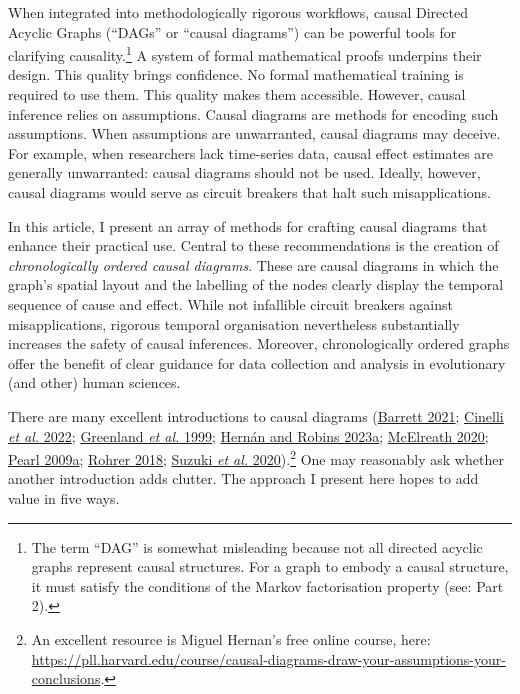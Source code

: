 \documentclass[
  singlecolumn]{article}
\begin{document}
When integrated into methodologically rigorous workflows, causal
Directed Acyclic Graphs (``DAGs'' or ``causal diagrams'') can be
powerful tools for clarifying causality.\footnote{The term ``DAG'' is
  somewhat misleading because not all directed acyclic graphs represent
  causal structures. For a graph to embody a causal structure, it must
  satisfy the conditions of the Markov factorisation property (see: Part
  2).} A system of formal mathematical proofs underpins their design.
This quality brings confidence. No formal mathematical training is
required to use them. This quality makes them accessible. However,
causal inference relies on assumptions. Causal diagrams are methods for
encoding such assumptions. When assumptions are unwarranted, causal
diagrams may deceive. For example, when researchers lack time-series
data, causal effect estimates are generally unwarranted: causal diagrams
should not be used. Ideally, however, causal diagrams would serve as
circuit breakers that halt such misapplications.

In this article, I present an array of methods for crafting causal
diagrams that enhance their practical use. Central to these
recommendations is the creation of \emph{chronologically ordered causal
diagrams}. These are causal diagrams in which the graph's spatial layout
and the labelling of the nodes clearly display the temporal sequence of
cause and effect. While not infallible circuit breakers against
misapplications, rigorous temporal organisation nevertheless
substantially increases the safety of causal inferences. Moreover,
chronologically ordered graphs offer the benefit of clear guidance for
data collection and analysis in evolutionary (and other) human sciences.

There are many excellent introductions to causal diagrams
(\protect\hyperlink{ref-barrett2021}{Barrett 2021};
\protect\hyperlink{ref-cinelli2022}{Cinelli \emph{et al.} 2022};
\protect\hyperlink{ref-greenland1999}{Greenland \emph{et al.} 1999};
\protect\hyperlink{ref-hernuxe1n2023}{Hernán and Robins 2023a};
\protect\hyperlink{ref-mcelreath2020}{McElreath 2020};
\protect\hyperlink{ref-pearl2009}{Pearl 2009a};
\protect\hyperlink{ref-rohrer2018}{Rohrer 2018};
\protect\hyperlink{ref-suzuki2020}{Suzuki \emph{et al.}
2020}).\footnote{An excellent resource is Miguel Hernan's free online
  course, here:
  \url{https://pll.harvard.edu/course/causal-diagrams-draw-your-assumptions-your-conclusions}.}
One may reasonably ask whether another introduction adds clutter. The
approach I present here hopes to add value in five ways.
\end{document}

